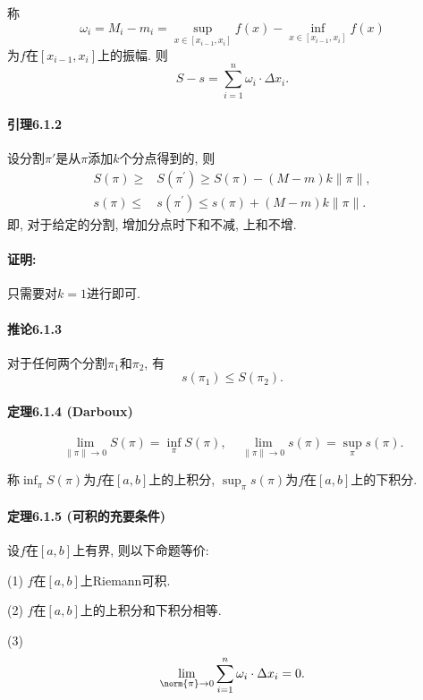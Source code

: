 称
\[
\omega_{i}=M_{i}-m_{i}=\sup_{x\in\left[x_{i-1},x_{i}\right]}f(x)-\inf_{x\in\left[x_{i-1},x_{i}\right]}f(x)
\]
为$f$在$[x_{i-1},x_{i}]$上的振幅. 则
\[
S-s=\sum_{i=1}^{n}\omega_{i}\cdot\Delta x_{i}.
\]


\paragraph{引理6.1.2}

设分割$\pi'$是从$\pi$添加$k$个分点得到的, 则
\[
\begin{aligned}S(\pi)\geqslant & S\left(\pi^{\prime}\right)\geqslant S(\pi)-(M-m)k\|\pi\|,\\
	s(\pi)\leqslant & s\left(\pi^{\prime}\right)\leqslant s(\pi)+(M-m)k\|\pi\|.
\end{aligned}
\]
即, 对于给定的分割, 增加分点时下和不减, 上和不增.

\paragraph{证明:}

只需要对$k=1$进行即可.

\paragraph{推论6.1.3}

对于任何两个分割$\pi_{1}$和$\pi_{2}$, 有
\[
s(\pi_{1})\le S(\pi_{2}).
\]


\paragraph{定理6.1.4 (Darboux)}

\[
\lim_{\|\pi\|\rightarrow0}S(\pi)=\inf_{\pi}S(\pi),\quad\lim_{\|\pi\|\rightarrow0}s(\pi)=\sup_{\pi}s(\pi).
\]

称$\inf_{\pi}S(\pi)$为$f$在$[a,b]$上的上积分, $\sup_{\pi}s(\pi)$为$f$在$[a,b]$上的下积分.

\paragraph{定理6.1.5 (可积的充要条件)}

设$f$在$[a,b]$上有界, 则以下命题等价:

(1) $f$在$[a,b]$上Riemann可积.

(2) $f$在$[a,b]$上的上积分和下积分相等.

(3) 
\[
\lim_{\norm{\pi}\to0}\sum_{i=1}^{n}\omega_{i}\cdot\Delta x_{i}=0.
\]

